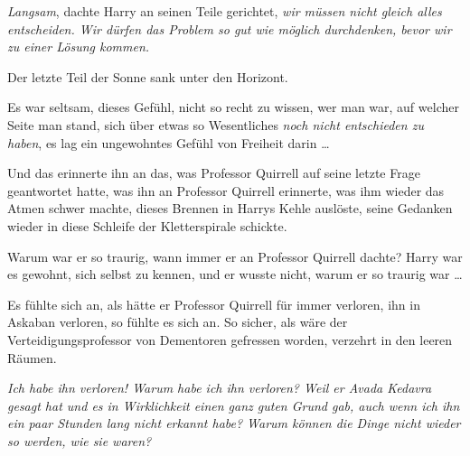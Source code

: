 \emph{Langsam}, dachte Harry an seinen Teile gerichtet, \emph{wir müssen nicht gleich alles entscheiden. Wir dürfen das Problem so gut wie möglich durchdenken, bevor wir zu einer Lösung kommen.}

Der letzte Teil der Sonne sank unter den Horizont.

Es war seltsam, dieses Gefühl, nicht so recht zu wissen, wer man war, auf welcher Seite man stand, sich über etwas so Wesentliches \emph{noch nicht entschieden zu haben}, es lag ein ungewohntes Gefühl von Freiheit darin …

Und das erinnerte ihn an das, was Professor Quirrell auf seine letzte Frage geantwortet hatte, was ihn an Professor Quirrell erinnerte, was ihm wieder das Atmen schwer machte, dieses Brennen in Harrys Kehle auslöste, seine Gedanken wieder in diese Schleife der Kletterspirale schickte.

Warum war er so traurig, wann immer er an Professor Quirrell dachte? Harry war es gewohnt, sich selbst zu kennen, und er wusste nicht, warum er so traurig war …

Es fühlte sich an, als hätte er Professor Quirrell für immer verloren, ihn in Askaban verloren, so fühlte es sich an. So sicher, als wäre der Verteidigungsprofessor von Dementoren gefressen worden, verzehrt in den leeren Räumen.

\emph{Ich habe ihn verloren! Warum habe ich ihn verloren? Weil er Avada Kedavra gesagt hat und es in Wirklichkeit einen ganz guten Grund gab, auch wenn ich ihn ein paar Stunden lang nicht erkannt habe? Warum können die Dinge nicht wieder so werden, wie sie waren?}

